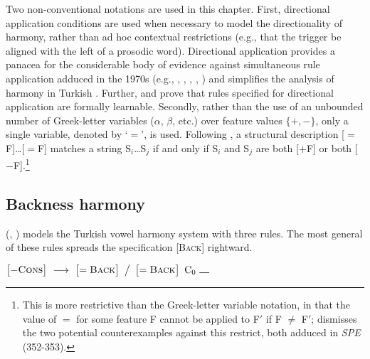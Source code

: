 Two non-conventional notations are used in this chapter. First, directional application conditions are used when necessary to model the directionality of harmony, rather than ad hoc contextual restrictions (e.g., that the trigger be aligned with the left of a prosodic word). Directional application provides a panacea for the considerable body of evidence against simultaneous rule application adduced in the 1970s (e.g., \citealt{Howard1972}, \citeauthor{Kenstowicz1973} \citeyear[14f.]{Kenstowicz1973}, \citeyear[189f.]{Kenstowicz1977}, \citeyear[318f.]{Kenstowicz1979}, \citealt{Piggott1975}) and simplifies the analysis of harmony in Turkish \citep[209f.]{Anderson1974}. Further, \citet{Johnson1972} and \citet{Kaplan1994} prove that rules specified for directional application are formally learnable. Secondly, rather than the use of an unbounded number of Greek-letter variables ($\alpha$, $\beta$, etc.) over feature values $\{+, -\}$, only a single variable, denoted by `$=$', is used. Following \citet{McCawley1973}, a structural description [$=$F]\ldots{}[$=$F] matches a string S$_i$\ldots{}S$_j$ if and only if S$_i$ and S$_j$ are both [$+$F] or both [$-$F].\footnote{This is more restrictive than the Greek-letter variable notation, in that the value of $=$ for some feature F cannot be applied to F$'$ if F $\ne$ F$'$; \citet{Odden2012} dismisses the two potential counterexamples against this restrict, both adduced in \emph{SPE} (352-353).} 

\subsection{Backness harmony}

\citeauthor{Lees1966b} (\citeyear[35]{Lees1966b}, \citeyear[284]{Lees1966a}) models the Turkish vowel harmony system with three rules. The most general of these rules spreads the specification [\textsc{Back}] rightward.

\begin{example}
$\begin{bmatrix} -\textsc{Cons} \end{bmatrix}~\goesto~\begin{bmatrix} =\textsc{Back} \end{bmatrix}~\big /~\begin{bmatrix} =\textsc{Back} \end{bmatrix}~\textrm{C}_0~\gap$
\end{example}

